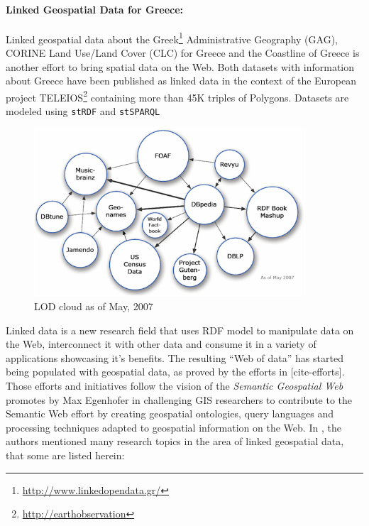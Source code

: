   

\paragraph{Linked Geospatial Data for Greece:}
 Linked geospatial data about the Greek\footnote{\url{ http://www.linkedopendata.gr/}} Administrative Geography (GAG), CORINE Land Use/Land Cover (CLC) for Greece and the Coastline of Greece is another effort to bring spatial data on the Web. Both datasets with information about Greece have been published as linked data in the context of the European project TELEIOS\footnote{\url{http://earthobservation}} containing more than 45K triples of Polygons. Datasets are modeled using \texttt{stRDF} and \texttt{stSPARQL} 

\begin{figure}[ht!]
\includegraphics[width=0.9\textwidth]{img/lod-cloud2007.png}
\caption{LOD cloud as of May, 2007}
\label{fig:lodcloud2007}
\end{figure}

Linked data is a new research field that uses RDF model to manipulate data on the Web, interconnect it with other data and consume it in a variety of applications showcasing it's benefits. The resulting ``Web of data'' has started being populated with geospatial data, as proved by the efforts in [cite-efforts]. Those efforts and initiatives follow the vision of the \textit{Semantic Geospatial Web} promotes by Max Egenhofer in \cite{egenhofer12} challenging GIS researchers to contribute to the Semantic Web effort by creating geospatial ontologies, query languages and processing techniques adapted to geospatial information on the Web. In \cite{koubarakis12}, the authors mentioned many research topics in the area of linked geospatial data, that some are listed herein:

